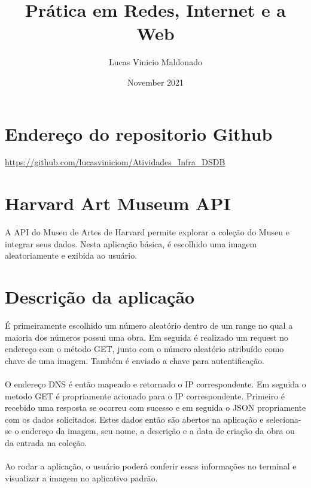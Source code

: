 \documentclass{article}
\title{Prática em Redes, Internet e a Web}
\author{Lucas Vinicio Maldonado}
\date{November 2021}
\begin{document}
\maketitle
\section{Endereço do repositorio Github}
\url{https://github.com/lucasviniciom/Atividades\_Infra\_DSDB}

\section{Harvard Art Museum API}
A API do Museu de Artes de Harvard permite explorar a coleção do Museu e integrar seus dados. Nesta aplicação básica, é escolhido uma imagem aleatoriamente e exibida ao usuário. 

\section{Descrição da aplicação}
É primeiramente escolhido um número aleatório dentro de um range no qual a maioria dos números possui uma obra.
Em seguida é realizado um request no endereço com o método GET, junto com o número aleatório atribuído como chave de uma imagem. Também é enviado a chave para autentificação. 
\\
\\
O endereço DNS é então mapeado e retornado o IP correspondente. Em seguida o metodo GET é propriamente acionado para o IP correspondente. Primeiro é recebido uma resposta se ocorreu com sucesso e em seguida o JSON propriamente com os dados solicitados. Estes dados então são abertos na aplicação e seleciona-se o endereço da imagem, seu nome, a descrição e a data de criação da obra ou da entrada na coleção.
\\
\\
Ao rodar a aplicação, o usuário poderá conferir essas informações no terminal e visualizar a imagem no aplicativo padrão.
\end{document}
